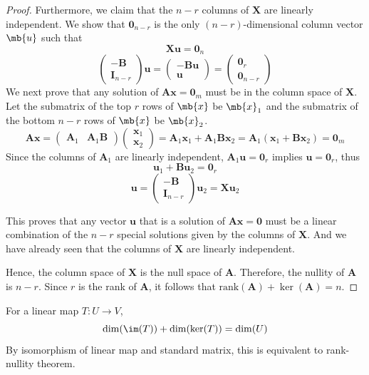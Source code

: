 \documentclass[a4paper,12pt]{report}
\begin{document}
\begin{proof}
Furthermore, we claim that the \(n-r\) columns of \(\mathbf{X}\) are linearly independent. We show that $\mathbf{0}_{n-r}$ is the only $(n-r)$-dimensional column vector $\mb{u}$ such that
\[\mathbf{Xu}=\mathbf{0}_n\]
\[\begin{pmatrix}
-\mathbf{B} \\
 \mathbf{I}_{n-r}
\end{pmatrix}\mathbf{u} = \begin{pmatrix}
-\mathbf{B}\mathbf{u} \\
 \mathbf{u}
\end{pmatrix} = \begin{pmatrix}
\mathbf{0}_r \\
 \mathbf{0}_{n-r}
\end{pmatrix}\]
We next prove that any solution of \(\mathbf{Ax} = \mathbf{0}_{m}\) must be in the column space of \(\mathbf{X}\). Let the submatrix of the top $r$ rows of $\mb{x}$ be $\mb{x}_1$ and the submatrix of the bottom $n-r$ rows of $\mb{x}$ be $\mb{x}_2$.
\[\mathbf{A}\mathbf{x} = \begin{pmatrix}\mathbf{A}_1 & \mathbf{A}_1\mathbf{B}\end{pmatrix} \begin{pmatrix} \mathbf{x}_1 \\ \mathbf{x}_2 \end{pmatrix} = \mathbf{A}_1\mathbf{x}_1 + \mathbf{A}_1\mathbf{B}\mathbf{x}_2 = \mathbf{A}_1(\mathbf{x}_1 + \mathbf{B}\mathbf{x}_2) = \mathbf{0}_{m} \]
Since the columns of \(\mathbf{A}_1\) are linearly independent, \(\mathbf{A}_1\mathbf{u} = \mathbf{0}_{r}\) implies \(\mathbf{u} = \mathbf{0}_{r}\), thus
\[\mathbf{u}_1 + \mathbf{B}\mathbf{u}_2  = \mathbf{0}_{r} \]
\[\mathbf{u} = \begin{pmatrix} -\mathbf{B} \\ \mathbf{I}_{n-r} \end{pmatrix}\mathbf{u}_2 = \mathbf{X}\mathbf{u}_2\]

This proves that any vector \(\mathbf{u}\) that is a solution of \(\mathbf{Ax} = \mathbf{0}\) must be a linear combination of the \(n-r\) special solutions given by the columns of \(\mathbf{X}\). And we have already seen that the columns of \(\mathbf{X}\) are linearly independent. 

Hence, the column space of \(\mathbf{X}\) is the null space of \(\mathbf{A}\). Therefore, the nullity of \(\mathbf{A}\) is \(n - r\). Since \(r\) is the rank of \(\mathbf{A}\), it follows that \(\text{rank}(\mathbf{A}) + \ker(\mathbf{A}) = n\).
\end{proof}
For a linear map $T\colon U\to V$,
\[\dim(\im(T))+\dim(\ker(T))=\dim(U)\]
\bpr
By isomorphism of linear map and standard matrix, this is equivalent to rank-nullity theorem.
\epr
\end{document}
